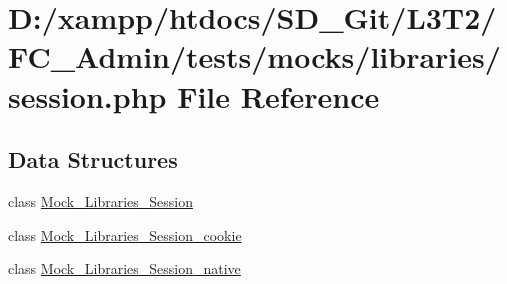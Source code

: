 \hypertarget{tests_2mocks_2libraries_2_session_8php}{}\section{D\+:/xampp/htdocs/\+S\+D\+\_\+\+Git/\+L3\+T2/\+F\+C\+\_\+\+Admin/tests/mocks/libraries/session.php File Reference}
\label{tests_2mocks_2libraries_2_session_8php}
\subsection*{Data Structures}
\begin{DoxyCompactItemize}
\item 
class \hyperlink{class_mock___libraries___session}{Mock\+\_\+\+Libraries\+\_\+\+Session}
\item 
class \hyperlink{class_mock___libraries___session__cookie}{Mock\+\_\+\+Libraries\+\_\+\+Session\+\_\+cookie}
\item 
class \hyperlink{class_mock___libraries___session__native}{Mock\+\_\+\+Libraries\+\_\+\+Session\+\_\+native}
\end{DoxyCompactItemize}
